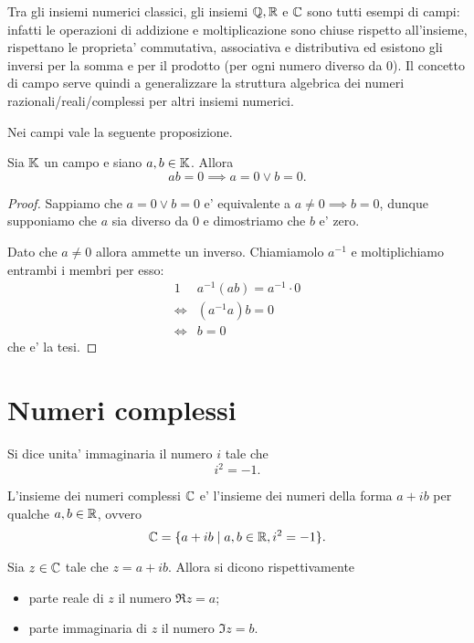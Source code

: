 Tra gli insiemi numerici classici, gli insiemi $\mathbb{Q}, \mathbb{R}$ e $\mathbb{C}$ sono tutti esempi di campi: infatti le operazioni di addizione e moltiplicazione sono chiuse rispetto all'insieme, rispettano le proprieta' commutativa, associativa e distributiva ed esistono gli inversi per la somma e per il prodotto (per ogni numero diverso da $0$). Il concetto di campo serve quindi a generalizzare la struttura algebrica dei numeri razionali/reali/complessi per altri insiemi numerici.

Nei campi vale la seguente proposizione.
\begin{proposition}
     \label{annullamento_prodotto}
    Sia $\mathbb{K}$ un campo e siano $a, b \in \mathbb{K}$. Allora \[
        ab = 0 \implies a = 0 \lor b = 0.    
    \]
\end{proposition}
\begin{proof}
    Sappiamo che $a = 0 \lor b = 0$ e' equivalente a $a \neq 0 \implies b = 0$, dunque supponiamo che $a$ sia diverso da $0$ e dimostriamo che $b$ e' zero.

    Dato che $a \neq 0$ allora ammette un inverso. Chiamiamolo $a^{-1}$ e moltiplichiamo entrambi i membri per esso:
    \begin{alignat*}
        {1}
        &a^{-1}(ab) = a^{-1} \cdot 0\\
        \iff &(a^{-1}a)b = 0 \\
        \iff &b = 0
    \end{alignat*}
    che e' la tesi.
\end{proof}

\section{Numeri complessi}

\begin{definition}
    Si dice unita' immaginaria il numero $i$ tale che \[
        i^2 = -1.    
    \]
\end{definition}

\begin{definition}
    L'insieme dei numeri complessi $\mathbb{C}$ e' l'insieme dei numeri della forma $a+ib$ per qualche $a, b \in \mathbb{R}$, ovvero \[
        \mathbb{C} = \{ a + ib \mid a, b \in \mathbb{R}, i^2 = -1\}.  
    \]
\end{definition}

\begin{definition}
    Sia $z \in \mathbb{C}$ tale che $z = a + ib$. Allora si dicono rispettivamente \begin{itemize}
        \item parte reale di $z$ il numero $\Re z = a$;
        \item parte immaginaria di $z$ il numero $\Im z = b$.
    \end{itemize}
\end{definition}

